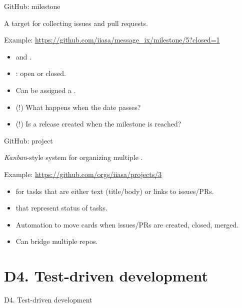\documentclass[12pt,aspectratio=169]{beamer}
\begin{document}
\begin{frame}{GitHub: milestone}

{\Large A target for collecting issues and pull requests.}

\bigskip
Example: \url{https://github.com/iiasa/message_ix/milestone/5?closed=1}

\begin{itemize}
  \item {} and .
  \item {}: open or closed.
  \item Can be assigned a .
  \item \alert{(!)} What happens when the date passes?
  \item \alert{(!)} Is a release created when the milestone is reached?
\end{itemize}

\end{frame}

\begin{frame}{GitHub: project}

{\Large \emph{Kanban}-style system for organizing multiple .}

\bigskip
Example: \url{https://github.com/orgs/iiasa/projects/3}

\begin{itemize}
  \item {} for tasks that are either text (title/body) or links to issues/PRs.
  \item {} that represent status of tasks.
  \item Automation to move cards when issues/PRs are created, closed, merged.
  \item Can bridge multiple repos.
\end{itemize}

\end{frame}

\section{D4. Test-driven development}
\begin{frame}{D4. Test-driven development}
\tableofcontents[hideothersubsections]
\end{frame}
\end{document}
